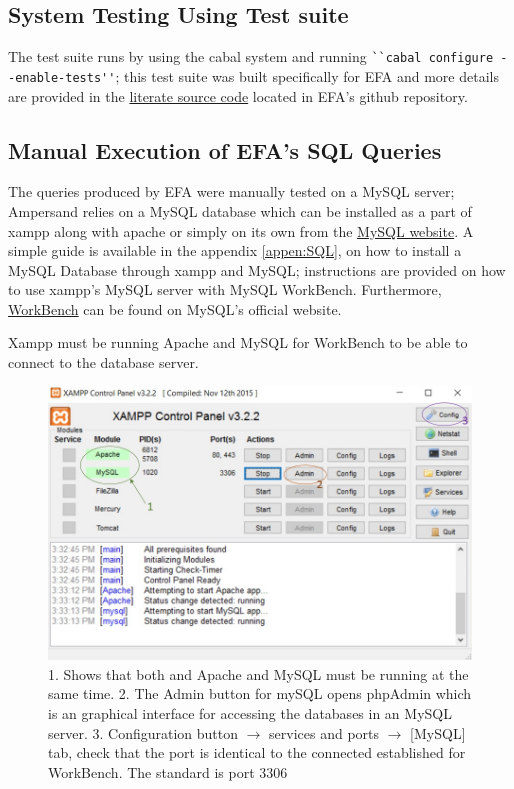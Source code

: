 \subsection{System Testing Using Test suite}
The test suite runs by using the cabal system and running 
\verb|``cabal configure --enable-tests''|; this test suite was built 
specifically for EFA and 
more details are provided in the 
\href{https://github.com/4ZP6Capstone2015/ampersand/blob/master/src/Database/Design/Ampersand/ECA2SQL/FreshName.lhs}{literate
 source code} located in EFA's github repository.

\subsection{Manual Execution of EFA's SQL Queries}

The queries produced by EFA were manually tested on a MySQL server; Ampersand 
relies on a MySQL database which can be installed as a part of xampp along with 
apache or simply on its own from the 
\href{https://dev.mysql.com/downloads/mysql/}{MySQL website}. A simple guide is 
available in the appendix \ref{appen:SQL}, on how to install a MySQL Database 
through xampp and MySQL; instructions are provided on how to use xampp's MySQL 
server with MySQL WorkBench. Furthermore, 
\href{https://dev.mysql.com/downloads/workbench/}{WorkBench} can be found on 
MySQL's official website.

Xampp must be running Apache and MySQL for WorkBench to be able to connect to 
the database server. 
\begin{figure}[!h]
    \includegraphics[width=\textwidth]{images/xampp}
    \caption{\footnotesize{1. Shows that both and Apache and MySQL must be 
    running at the same time. 2. The Admin button for mySQL opens phpAdmin 
    which is an graphical interface for accessing the databases in an MySQL 
    server. 3. Configuration button $\rightarrow$ services and ports 
    $\rightarrow$ [MySQL] tab, check that the port is identical to the 
    connected established for WorkBench. The standard is port 3306 }}
\end{figure}

